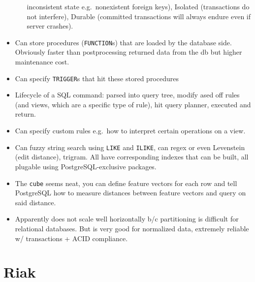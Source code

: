 \documentclass[10pt]{article}
\begin{document}
\begin{itemize}
\begin{itemize}
                inconsistent state e.g.\ nonexistent foreign keys), Isolated
                (transactions do not interfere), Durable (committed transactions
                will always endure even if server crashes).
        \end{itemize}
    \item Can store procedures (\lstinline{FUNCTION}s) that are loaded by the
        database side. Obviously faster than postprocessing returned data from
        the db but higher maintenance cost.
    \item Can specify \lstinline{TRIGGER}s that hit these stored procedures
    \item Lifecycle of a SQL command: parsed into query tree, modify ased off
        rules (and views, which are a specific type of rule), hit query planner,
        executed and return.
    \item Can specify custom rules e.g.\ how to interpret certain operations on
        a view.
    \item Can fuzzy string search using \lstinline{LIKE} and \lstinline{ILIKE},
        can regex or even Levenstein (edit distance), trigram. All have
        corresponding indexes that can be built, all plugable using
        PostgreSQL-exclusive packages.
    \item The \lstinline{cube} seems neat, you can define feature vectors for
        each row and tell PostgreSQL how to measure distances between feature
        vectors and query on said distance.
    \item Apparently does not scale well horizontally b/c partitioning is
        difficult for relational databases. But is very good for normalized
        data, extremely reliable w/ transactions + ACID compliance.
\end{itemize}

\section{Riak}
\end{document}
